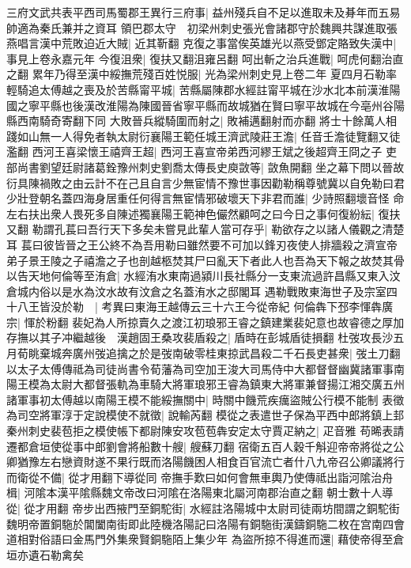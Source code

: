 三府文武共表平西司馬蜀郡王異行三府事|{
	益州殘兵自不足以進取未及朞年而五易帥適為秦氏兼并之資耳}
領巴郡太守　初梁州刺史張光會諸郡守於魏興共謀進取張燕唱言漢中荒敗迫近大賊|{
	近其靳翻}
克復之事當俟英雄光以燕受鄧定賂致失漢中|{
	事見上卷永嘉元年}
今復沮衆|{
	復扶又翻沮雍呂翻}
呵出斬之治兵進戰|{
	呵虎何翻治直之翻}
累年乃得至漢中綏撫荒殘百姓悦服|{
	光為梁州刺史見上卷二年}
夏四月石勒率輕騎追太傅越之喪及於苦縣甯平城|{
	苦縣屬陳郡水經註甯平城在沙水北本前漢淮陽國之寧平縣也後漢改淮陽為陳國晉省寧平縣而故城猶在賢曰寧平故城在今亳州谷陽縣西南騎奇寄翻下同}
大敗晉兵縱騎圍而射之|{
	敗補邁翻射而亦翻}
將士十餘萬人相踐如山無一人得免者執太尉衍襄陽王範任城王濟武陵莊王澹|{
	任音壬澹徒覽翻又徒濫翻}
西河王喜梁懷王禧齊王超|{
	西河王喜宣帝弟西河繆王斌之後超齊王冏之子}
吏部尚書劉望廷尉諸葛銓豫州刺史劉喬太傳長史庾敳等|{
	敳魚開翻}
坐之幕下問以晉故衍具陳禍敗之由云計不在己且自言少無宦情不豫世事因勸勒稱尊號冀以自免勒曰君少壯登朝名蓋四海身居重任何得言無宦情邪破壞天下非君而誰|{
	少詩照翻壞音怪}
命左右扶出衆人畏死多自陳述獨襄陽王範神色儼然顧呵之曰今日之事何復紛紜|{
	復扶又翻}
勒謂孔萇曰吾行天下多矣未嘗見此輩人當可存乎|{
	勒欲存之以諸人儀觀之清楚耳}
萇曰彼皆晉之王公終不為吾用勒曰雖然要不可加以鋒刃夜使人排牆殺之濟宣帝弟子景王陵之子禧澹之子也剖越柩焚其尸曰亂天下者此人也吾為天下報之故焚其骨以告天地何倫等至洧倉|{
	水經洧水東南過潁川長社縣分一支東流過許昌縣又東入汶倉城内俗以是水為汶水故有汶倉之名蓋洧水之邸閣耳}
遇勒戰敗東海世子及宗室四十八王皆没於勒　|{
	考異曰東海王越傳云三十六王今從帝紀}
何倫犇下邳李惲犇廣宗|{
	惲於粉翻}
裴妃為人所掠賣久之渡江初琅邪王睿之鎮建業裴妃意也故睿德之厚加存撫以其子冲繼越後　漢趙固王桑攻裴盾殺之|{
	盾時在彭城盾徒損翻}
杜弢攻長沙五月荀眺棄城奔廣州弢追擒之於是弢南破零桂東掠武昌殺二千石長吏甚衆|{
	弢土刀翻}
以太子太傅傳祗為司徒尚書令荀藩為司空加王浚大司馬侍中大都督督幽冀諸軍事南陽王模為太尉大都督張軌為車騎大將軍琅邪王睿為鎮東大將軍兼督揚江湘交廣五州諸軍事初太傅越以南陽王模不能綏撫關中|{
	時關中饑荒疾癘盜賊公行模不能制}
表徵為司空將軍淳于定說模使不就徵|{
	說輸芮翻}
模從之表遣世子保為平西中郎將鎮上邽秦州刺史裴苞拒之模使帳下都尉陳安攻苞苞犇安定太守賈疋納之|{
	疋音雅}
苟晞表請遷都倉垣使從事中郎劉會將船數十艘|{
	艘蘇刀翻}
宿衛五百人穀千斛迎帝帝將從之公卿猶豫左右戀資財遂不果行既而洛陽饑困人相食百官流亡者什八九帝召公卿議將行而衛從不備|{
	從才用翻下導從同}
帝撫手歎曰如何會無車輿乃使傳祗出詣河隂治舟楫|{
	河隂本漢平隂縣魏文帝改曰河隂在洛陽東北屬河南郡治直之翻}
朝士數十人導從|{
	從才用翻}
帝步出西掖門至銅駝街|{
	水經註洛陽城中太尉司徒兩坊間謂之銅駝街魏明帝置銅駞於閶闔南街即此陸機洛陽記曰洛陽有銅駞街漢鑄銅駞二枚在宫南四會道相對俗語曰金馬門外集衆賢銅駞陌上集少年}
為盜所掠不得進而還|{
	藉使帝得至倉垣亦遺石勒禽矣}
